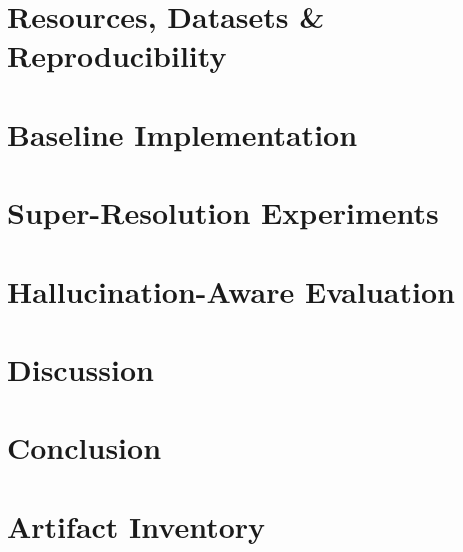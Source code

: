 \documentclass[12pt,a4paper]{report}
\begin{document}
\chapter{Resources, Datasets \& Reproducibility}


\chapter{Baseline Implementation}


\chapter{Super-Resolution Experiments}



\chapter{Hallucination-Aware Evaluation}


\chapter{Discussion}


\chapter{Conclusion}





\appendix
\chapter{Artifact Inventory}
\end{document}
